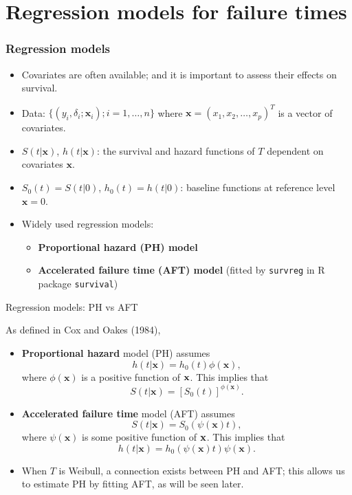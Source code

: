 \documentclass{beamer}
\newcommand{\currentsection}{}
\let\oldsection\section
\renewcommand{\section}[1]{\oldsection{#1}\renewcommand{\currentsection}{#1}}
\newenvironment{wideitemize}%
  {\begin{itemize}%
    \setlength{\parskip}{1em}}%
  {\end{itemize}}
\begin{document}
\section{Regression models for failure times}
\begin{frame} \frametitle{Regression models}

\begin{wideitemize}
\item 
Covariates are often available; and it is important to assess their effects on survival. 


\item Data: $\{(y_i, \delta_i; \mathbf{x}_i); i = 1,\ldots, n\}$ where
$\mathbf{x} = (x_1 , x_2 , \ldots, x_p )^T$ is
a vector of covariates.
\item 
$S(t|\mathbf{x})$, $h(t|\mathbf{x})$: 
the survival and hazard functions of $T$ dependent on
covariates $\mathbf{x}$. 

\item $S_0(t)=S(t|0)$, $h_0(t)=h(t|0)$:
baseline functions at reference level $\mathbf{x}=0$.


\item 
Widely used regression models:
\begin{wideitemize}
\item 
\textbf{Proportional hazard (PH) model} 
\item 
\textbf {Accelerated failure time (AFT) model} (fitted by \texttt{survreg} in R package \texttt{survival})
\end{wideitemize}
\end{wideitemize}
\end{frame}



\begin{frame} {Regression models: PH vs AFT}

As defined in Cox and Oakes (1984), 
\begin{wideitemize}



\item
{\bf Proportional hazard} model (PH) assumes 
\[h(t|\mathbf{x})=h_0(t)\phi(\mathbf{x}),\]
where $\phi(\mathbf{x})$ is a positive function of $\bf x$. 
This
implies that \[S(t|\mathbf{x})=[S_0(t)]^{\phi(\mathbf{x})}.\] 


\item
{\bf Accelerated failure time} model (AFT) assumes 
\[S(t|\mathbf{x})=S_0(\psi(\mathbf{x})t),\]
where $\psi(\mathbf{x})$ is some positive function of $\bf x$. 
This
implies that \[
h(t|\mathbf{x})=h_0(\psi(\mathbf{x})t)\psi(\mathbf{x}).\] 


\item When $T$ is Weibull, a  connection exists between PH and AFT; this allows us to estimate PH by fitting AFT, as will be seen later.


\end{wideitemize}
\end{frame}
\end{document}
